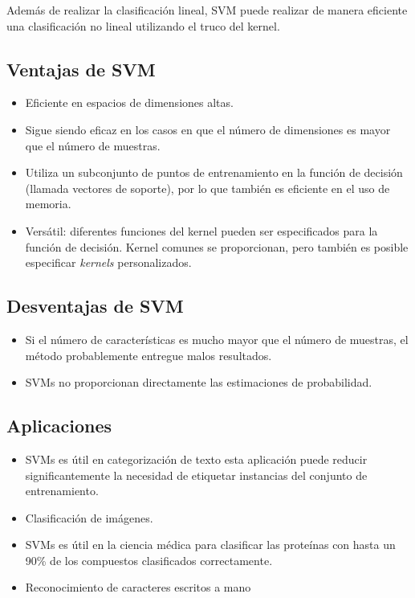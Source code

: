 Además de realizar la clasificación lineal, SVM puede realizar de manera eficiente una clasificación no lineal utilizando el truco del kernel.%

\subsection{Ventajas de SVM}
\begin{itemize}
\item Eficiente en espacios de dimensiones altas.
\item Sigue siendo eficaz en los casos en que el número de dimensiones es mayor que el número de muestras.
\item Utiliza un subconjunto de puntos de entrenamiento en la función de decisión (llamada vectores de soporte), por lo que también es eficiente en el uso de memoria.
\item Versátil: diferentes funciones del kernel pueden ser especificados para la función de decisión. Kernel comunes se proporcionan, pero también es posible especificar \textit{kernels} personalizados.
\end{itemize}

\subsection{Desventajas de SVM}
\begin{itemize}
\item Si el número de características es mucho mayor que el número de muestras, el método probablemente entregue malos resultados.
\item SVMs no proporcionan directamente las estimaciones de probabilidad.
\end{itemize}

\subsection{Aplicaciones}
\begin{itemize}
\item SVMs es útil en categorización de texto esta aplicación puede reducir significantemente la necesidad de etiquetar instancias del conjunto de entrenamiento.
\item Clasificación de imágenes. 
\item SVMs es útil en la ciencia médica para clasificar las proteínas con hasta un 90\% de los compuestos clasificados correctamente.
\item Reconocimiento de caracteres escritos a mano
\end{itemize}

